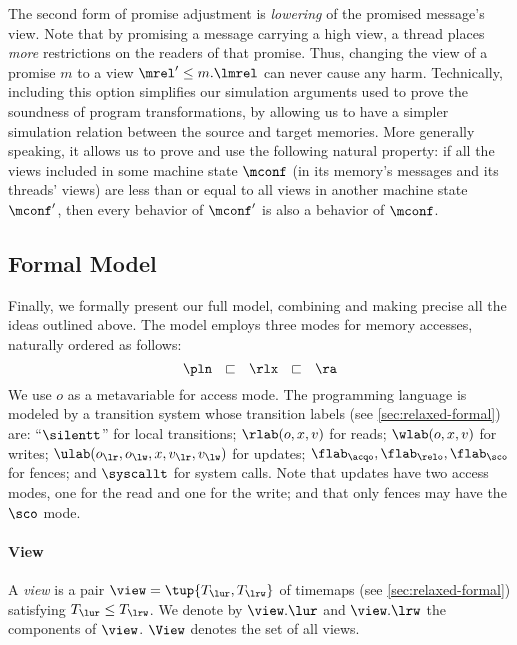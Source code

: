 The second form of promise adjustment is \emph{lowering} of the promised message's view.
Note that by promising a message carrying a high view, a thread places \emph{more} restrictions on the readers of that promise.
Thus, changing the view of a promise $m$ to a view $\mrel'\leq m.\lmrel$ can never cause any harm.
Technically, including this option simplifies our simulation arguments used to prove the soundness of program transformations,
by allowing us to have a simpler simulation relation between the source and target memories.
More generally speaking, it allows us to prove and use the following natural property:
if all the views included in some machine state $\mconf$ (in its memory's messages and its threads' views)
are less than or equal to all views in another machine state $\mconf'$, 
then every behavior of $\mconf'$ is also a behavior of $\mconf$.

\subsection{Formal Model}
\label{sec:full-formal}

\figfull

Finally, we formally present our full model,
combining and making precise all the ideas outlined above.
The model employs three modes for memory accesses, naturally ordered as follows:
\[\pln ~~\sqsubset~~\rlx~~\sqsubset~~\ra\]
We use $o$ as a metavariable for access mode.
The programming language is modeled by a transition system whose 
transition labels (see \cref{sec:relaxed-formal}) are:
``$\silentt$'' for local transitions;
${\rlab(o,x,v)}$  for reads;
${\wlab(o,x,v)}$  for writes;
${\ulab(o_\lr,o_\lw,x,v_\lr,v_\lw)}$  for updates;
${\flab_\acqo},{\flab_\relo},{\flab_\sco}$ for fences;
and  ${\syscallt}$ for system calls.
Note that updates have two access modes, one for the read and one for the write;
and that only fences may have the $\sco$ mode.

\paragraph{View}
A \emph{view} is a pair $\view=\tup{T_\lur,T_\lrw}$ of timemaps (see \cref{sec:relaxed-formal})
satisfying $T_\lur \leq T_\lrw$.
We denote by $\view.\lur$ and $\view.\lrw$ the components of $\view$.
$\View$ denotes the set of all views.

